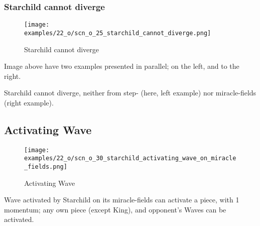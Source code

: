 \clearpage %

\subsubsection*{Starchild cannot diverge}
\label{sec:One/Starchild/Divergence/Starchild cannot diverge}

\vspace*{-1.4\baselineskip}
\noindent
\begin{figure}[!h]
\texttt{[image: examples/22\_o/scn\_o\_25\_starchild\_cannot\_diverge.png]}
\vspace*{-1.3\baselineskip}
\caption{Starchild cannot diverge}
\label{fig:scn_o_25_starchild_cannot_diverge}
\end{figure}

\vspace*{-0.4\baselineskip}
Image above have two examples presented in parallel; on the left, and to the right.

Starchild cannot diverge, neither from step- (here, left example) nor miracle-fields
(right example).

\clearpage %

\subsection*{Activating Wave}
\label{sec:One/Starchild/Activating Wave}

\noindent
\begin{wrapfigure}[8]{l}{0.4\textwidth}
\centering
\texttt{[image: examples/22\_o/scn\_o\_30\_starchild\_activating\_wave\_on\_miracle\_fields.png]}
\caption{Activating Wave}
\label{fig:scn_o_30_starchild_activating_wave_on_miracle_fields}
\end{wrapfigure}
Wave activated by Starchild on its miracle-fields can activate a piece, with
1 momentum; any own piece (except King), and opponent's Waves can be activated.

